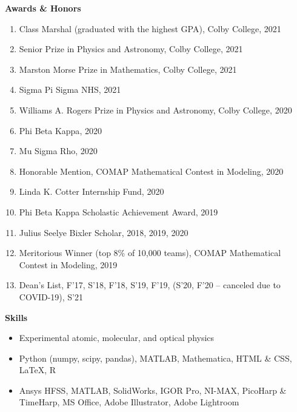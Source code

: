 \documentclass[10pt]{article}
\begin{document}
\noindent \large{\textbf{{Awards \& Honors }}}  \normalsize 

\begin{enumerate}
	\setlength\itemsep{-4pt}
	\item Class Marshal (graduated with the highest GPA), Colby College, {2021}
	\item Senior Prize in Physics and Astronomy, Colby College, {2021}
	\item Marston Morse Prize in Mathematics, Colby College, {2021}
	\item Sigma Pi Sigma NHS, {2021}
	\item {Williams A. Rogers Prize in Physics and Astronomy}, Colby College, {2020} 
	\item {Phi Beta Kappa}, {2020} 
	\item {Mu Sigma Rho}, {2020}
	\item {Honorable Mention,}  COMAP Mathematical Contest in Modeling, {2020}
	\item {Linda K. Cotter Internship Fund}, {2020}
	\item {Phi Beta Kappa Scholastic Achievement Award,} {2019}
	\item {Julius Seelye Bixler Scholar,} {2018, 2019, 2020}
	\item {Meritorious Winner (top 8\% of 10,000 teams),}  COMAP Mathematical Contest in Modeling, {2019}
	\item {Dean’s List}, {F'17, S'18, F'18, S'19, F'19, (S'20, F'20 -- canceled due to COVID-19), S'21}
\end{enumerate}



\noindent \large{\textbf{{Skills}}} \normalsize

\begin{itemize}
\setlength\itemsep{-4pt}
\item Experimental atomic, molecular, and optical physics
\item {} Python (numpy, scipy, pandas), MATLAB, Mathematica, HTML \& CSS, \LaTeX{}, R
\item {} Ansys HFSS, MATLAB, SolidWorks, IGOR Pro, NI-MAX, PicoHarp \& TimeHarp, MS Office,  Adobe Illustrator, Adobe Lightroom
\end{itemize}
\end{document}
